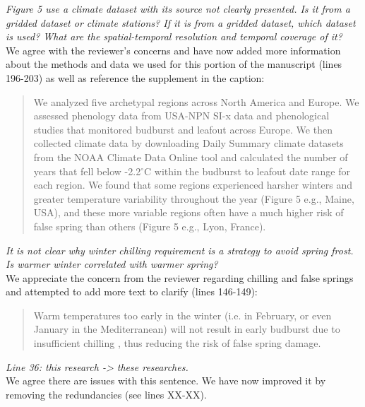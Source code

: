 \documentclass[11pt,a4paper]{article}
\begin{document}
\textit{Figure 5 use a climate dataset with its source not clearly presented. Is it from a gridded dataset or climate stations? If it is from a gridded dataset, which dataset is used? What are the spatial-temporal resolution and temporal coverage of it?} \\

We agree with the reviewer's concerns and have now added more information about the methods and data we used for this portion of the manuscript (lines 196-203) as well as reference the supplement in the caption: \\

\begin{quotation}
We analyzed five archetypal regions across North America and Europe. We assessed phenology data from USA-NPN SI-x data and phenological studies that monitored budburst and leafout across Europe. We then collected climate data by downloading Daily Summary climate datasets from the NOAA Climate Data Online tool \citep{NOAA} and calculated the number of years that fell below -2.2$^{\circ}$C within the budburst to leafout date range for each region. We found that some regions experienced harsher winters and greater temperature variability throughout the year (Figure 5 e.g., Maine, USA), and these more variable regions often have a much higher risk of false spring than others (Figure 5 e.g., Lyon, France).
\end{quotation} 

\textit{It is not clear why winter chilling requirement is a strategy to avoid spring frost. Is warmer winter correlated with warmer spring?} \\

We appreciate the concern from the reviewer regarding chilling and false springs and attempted to add more text to clarify (lines 146-149): \\

\begin{quotation}
Warm temperatures too early in the winter (i.e. in February, or even January in the Mediterranean) will not result in early budburst due to insufficient chilling \citep{Basler2012}, thus reducing the risk of false spring damage.
\end{quotation} 

\textit{Line 36: this research -> these researches.}\\

We agree there are issues with this sentence. We have now improved it by removing the redundancies (see lines XX-XX). \\ %
\end{document}
